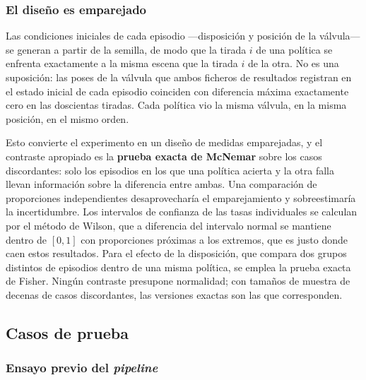 \subsubsection{El diseño es emparejado}

Las condiciones iniciales de cada episodio —disposición y posición de la válvula— se generan a
partir de la semilla, de modo que la tirada $i$ de una política se enfrenta exactamente a la misma
escena que la tirada $i$ de la otra. No es una suposición: las poses de la válvula que ambos
ficheros de resultados registran en el estado inicial de cada episodio coinciden con diferencia
máxima exactamente cero en las doscientas tiradas. Cada política vio la misma válvula, en la misma
posición, en el mismo orden.

Esto convierte el experimento en un diseño de medidas emparejadas, y el contraste apropiado es la
\textbf{prueba exacta de McNemar} sobre los casos discordantes: solo los episodios en los que una
política acierta y la otra falla llevan información sobre la diferencia entre ambas. Una comparación
de proporciones independientes desaprovecharía el emparejamiento y sobreestimaría la incertidumbre.
Los intervalos de confianza de las tasas individuales se calculan por el método de Wilson, que a
diferencia del intervalo normal se mantiene dentro de $[0,1]$ con proporciones próximas a los
extremos, que es justo donde caen estos resultados. Para el efecto de la disposición, que compara
dos grupos distintos de episodios dentro de una misma política, se emplea la prueba exacta de
Fisher. Ningún contraste presupone normalidad; con tamaños de muestra de decenas de casos
discordantes, las versiones exactas son las que corresponden.

\subsection{Casos de prueba}

\subsubsection{Ensayo previo del \textit{pipeline}}


